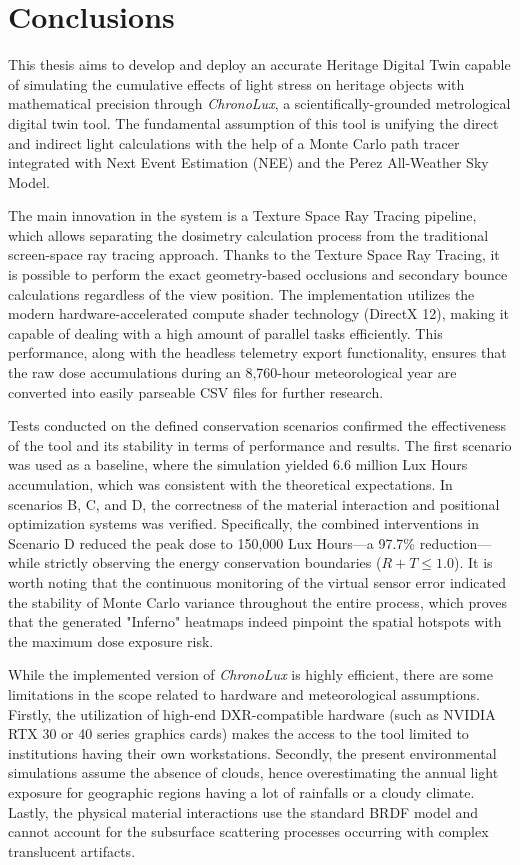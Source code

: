 \chapter{Conclusions}
\pagestyle{fancy}

This thesis aims to develop and deploy an accurate Heritage Digital Twin capable of simulating the cumulative effects of light stress on heritage objects with mathematical precision through \textit{ChronoLux}, a scientifically-grounded metrological digital twin tool. The fundamental assumption of this tool is unifying the direct and indirect light calculations with the help of a Monte Carlo path tracer integrated with Next Event Estimation (NEE) and the Perez All-Weather Sky Model.

The main innovation in the system is a Texture Space Ray Tracing pipeline, which allows separating the dosimetry calculation process from the traditional screen-space ray tracing approach. Thanks to the Texture Space Ray Tracing, it is possible to perform the exact geometry-based occlusions and secondary bounce calculations regardless of the view position. The implementation utilizes the modern hardware-accelerated compute shader technology (DirectX 12), making it capable of dealing with a high amount of parallel tasks efficiently. This performance, along with the headless telemetry export functionality, ensures that the raw dose accumulations during an 8,760-hour meteorological year are converted into easily parseable CSV files for further research.

Tests conducted on the defined conservation scenarios confirmed the effectiveness of the tool and its stability in terms of performance and results. The first scenario was used as a baseline, where the simulation yielded 6.6 million Lux Hours accumulation, which was consistent with the theoretical expectations. In scenarios B, C, and D, the correctness of the material interaction and positional optimization systems was verified. Specifically, the combined interventions in Scenario D reduced the peak dose to 150,000 Lux Hours---a 97.7\% reduction---while strictly observing the energy conservation boundaries ($R + T \le 1.0$). It is worth noting that the continuous monitoring of the virtual sensor error indicated the stability of Monte Carlo variance throughout the entire process, which proves that the generated "Inferno" heatmaps indeed pinpoint the spatial hotspots with the maximum dose exposure risk.

While the implemented version of \textit{ChronoLux} is highly efficient, there are some limitations in the scope related to hardware and meteorological assumptions. Firstly, the utilization of high-end DXR-compatible hardware (such as NVIDIA RTX 30 or 40 series graphics cards) makes the access to the tool limited to institutions having their own workstations. Secondly, the present environmental simulations assume the absence of clouds, hence overestimating the annual light exposure for geographic regions having a lot of rainfalls or a cloudy climate. Lastly, the physical material interactions use the standard BRDF model and cannot account for the subsurface scattering processes occurring with complex translucent artifacts.

